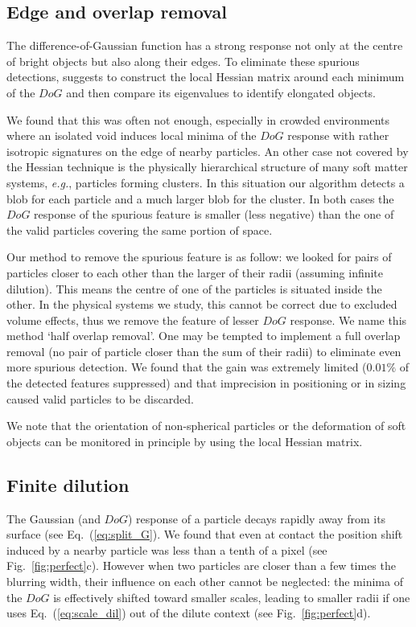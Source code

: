 \documentclass[8.5pt,twoside,twocolumn]{article}
\begin{document}
\subsection{Edge and overlap removal}

The difference-of-Gaussian function has a strong response not only at the centre of bright objects but also along their edges. To eliminate these spurious detections, \citet{Lowe2004} suggests to construct the local Hessian matrix around each minimum of the $DoG$ and then compare its eigenvalues to identify elongated objects.

We found that this was often not enough, especially in crowded environments where an isolated void induces local minima of the $DoG$ response with rather isotropic signatures on the edge of nearby particles. An other case not covered by the Hessian technique is the physically hierarchical structure of many soft matter systems, \emph{e.g.}, particles forming clusters. In this situation our algorithm detects a blob for each particle and a much larger blob for the cluster. In both cases the $DoG$ response of the spurious feature is smaller (less negative) than the one of the valid particles covering the same portion of space. 

Our method to remove the spurious feature is as follow: we looked for pairs of particles closer to each other than the larger of their radii (assuming infinite dilution). This means the centre of one of the particles is situated inside the other. In the physical systems we study, this cannot be correct due to excluded volume effects, thus we remove the feature of lesser $DoG$ response. We name this method `half overlap removal'. One may be tempted to implement a full overlap removal (no pair of particle closer than the sum of their radii) to eliminate even more spurious detection. We found that the gain was extremely limited ($0.01\%$ of the detected features suppressed) and that imprecision in positioning or in sizing caused valid particles to be discarded.

We note that the orientation of non-spherical particles or the deformation of soft objects can be monitored in principle by using the local Hessian matrix.

\subsection{Finite dilution}
The Gaussian (and $DoG$) response of a particle decays rapidly away from its surface (see Eq.~(\ref{eq:split_G}). We found that even at contact the position shift induced by a nearby particle was less than a tenth of a pixel (see Fig.~\ref{fig:perfect}c). However when two particles are closer than a few times the blurring width, their influence on each other cannot be neglected: the minima of the $DoG$ is effectively shifted toward smaller scales, leading to smaller radii if one uses Eq.~(\ref{eq:scale_dil}) out of the dilute context (see Fig.~\ref{fig:perfect}d).
\end{document}
